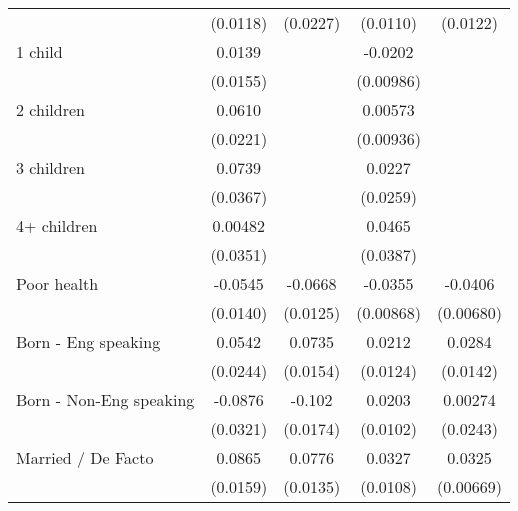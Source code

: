 {\begin{tabular}{l*{4}{c}}
                    &    (0.0118)         &    (0.0227)         &    (0.0110)         &    (0.0122)         \\
[1em]
1 child             &      0.0139         &                     &     -0.0202\sym{*}  &                     \\
                    &    (0.0155)         &                     &   (0.00986)         &                     \\
[1em]
2 children          &      0.0610\sym{**} &                     &     0.00573         &                     \\
                    &    (0.0221)         &                     &   (0.00936)         &                     \\
[1em]
3 children          &      0.0739\sym{*}  &                     &      0.0227         &                     \\
                    &    (0.0367)         &                     &    (0.0259)         &                     \\
[1em]
4+ children         &     0.00482         &                     &      0.0465         &                     \\
                    &    (0.0351)         &                     &    (0.0387)         &                     \\
[1em]
Poor health         &     -0.0545\sym{***}&     -0.0668\sym{***}&     -0.0355\sym{***}&     -0.0406\sym{***}\\
                    &    (0.0140)         &    (0.0125)         &   (0.00868)         &   (0.00680)         \\
[1em]
Born - Eng speaking &      0.0542\sym{*}  &      0.0735\sym{***}&      0.0212         &      0.0284\sym{*}  \\
                    &    (0.0244)         &    (0.0154)         &    (0.0124)         &    (0.0142)         \\
[1em]
Born - Non-Eng speaking&     -0.0876\sym{**} &      -0.102\sym{***}&      0.0203\sym{*}  &     0.00274         \\
                    &    (0.0321)         &    (0.0174)         &    (0.0102)         &    (0.0243)         \\
[1em]
Married / De Facto  &      0.0865\sym{***}&      0.0776\sym{***}&      0.0327\sym{**} &      0.0325\sym{***}\\
                    &    (0.0159)         &    (0.0135)         &    (0.0108)         &   (0.00669)         \\

\end{tabular}}

